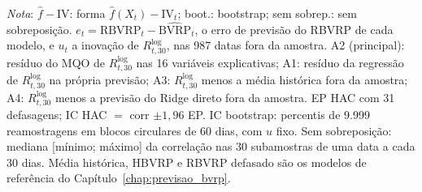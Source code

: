 \begin{table}[H]
{\begin{tabular}{lrrrccc}
\bottomrule
\end{tabular}}
\par\smallskip
\parbox{0.95\linewidth}{\footnotesize\textit{Nota}: $\hat f - \text{IV}$: forma $\hat f(X_t) - \text{IV}_t$; boot.: bootstrap; sem sobrep.: sem sobreposição. $e_t = \text{RBVRP}_t - \widehat{\text{BVRP}}_t$, o erro de previsão do RBVRP de cada modelo, e $u_t$ a inovação de $R^{\log}_{t,30}$, nas 987 datas fora da amostra. A2 (principal): resíduo do MQO de $R^{\log}_{t,30}$ nas 16 variáveis explicativas; A1: resíduo da regressão de $R^{\log}_{t,30}$ na própria previsão; A3: $R^{\log}_{t,30}$ menos a média histórica fora da amostra; A4: $R^{\log}_{t,30}$ menos a previsão do Ridge direto fora da amostra. EP HAC com 31 defasagens; IC HAC $=$ corr $\pm 1{,}96$ EP. IC bootstrap: percentis de 9.999 reamostragens em blocos circulares de 60 dias, com $u$ fixo. Sem sobreposição: mediana [mínimo; máximo] da correlação nas 30 subamostras de uma data a cada 30 dias. Média histórica, HBVRP e RBVRP defasado são os modelos de referência do Capítulo~\ref{chap:previsao_bvrp}.}
\end{table}
